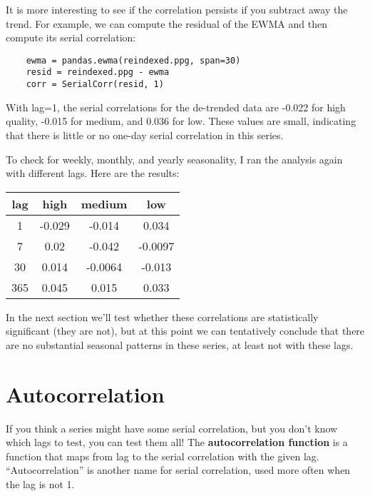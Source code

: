 It is more interesting to see if the correlation persists if you
subtract away the trend.  For example, we can compute the residual
of the EWMA and then compute its serial correlation:

\begin{verbatim}
    ewma = pandas.ewma(reindexed.ppg, span=30)
    resid = reindexed.ppg - ewma
    corr = SerialCorr(resid, 1)
\end{verbatim}

With lag=1, the serial correlations for the de-trended data are
-0.022 for high quality, -0.015 for medium, and 0.036 for low.
These values are small, indicating that there is little or
no one-day serial correlation in this series.

To check for weekly, monthly, and yearly seasonality, I ran
the analysis again with different lags.  Here are the results:

\begin{center}
\begin{tabular}{|c|c|c|c|}
\hline
lag & high & medium & low \\ \hline
1 & -0.029 & -0.014 & 0.034 \\
7 & 0.02 & -0.042 & -0.0097 \\
30 & 0.014 & -0.0064 & -0.013 \\
365 & 0.045 & 0.015 & 0.033 \\
\hline
\end{tabular}
\end{center}

In the next section we'll test whether these correlations are
statistically significant (they are not), but at this point we can
tentatively conclude that there are no substantial seasonal patterns
in these series, at least not with these lags.
   


\section{Autocorrelation}

If you think a series might have some serial correlation, but you
don't know which lags to test, you can test them all!  The {\bf
  autocorrelation function} is a function that maps from lag to the
serial correlation with the given lag.  ``Autocorrelation'' is another
name for serial correlation, used more often when the lag is not 1.

